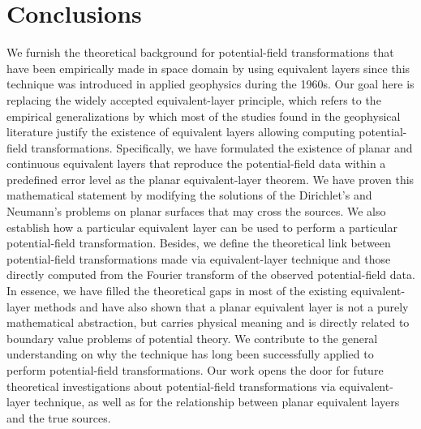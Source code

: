 \section{Conclusions}
\label{sec:conclusions}

We furnish the theoretical background for potential-field transformations
that have been empirically made in space domain by using equivalent layers since 
this technique was introduced in applied geophysics during the 1960s.
Our goal here is replacing the widely accepted equivalent-layer principle, which 
refers to the empirical generalizations
by which most of the studies found in the geophysical literature justify the existence of
equivalent layers allowing computing potential-field transformations.
Specifically, we have formulated the existence of planar and continuous equivalent layers that 
reproduce the potential-field data within a predefined error level
as the planar equivalent-layer theorem.
We have proven this mathematical statement by modifying the solutions of the 
Dirichlet's and Neumann's problems on planar surfaces that may cross the sources.
We also establish how a particular equivalent layer can be used to perform a particular 
potential-field transformation.
Besides, we define the theoretical link between potential-field transformations made via 
equivalent-layer 
technique and those directly computed from the Fourier transform of the observed 
potential-field data. 
In essence, we have filled the theoretical gaps in most of the existing equivalent-layer 
methods and have also shown 
that a planar equivalent layer is not a purely mathematical abstraction,
but carries physical meaning and is directly related to boundary value problems of potential 
theory.
We contribute to the general understanding on why the technique has long been 
successfully applied to perform potential-field transformations. 
Our work opens the door for future theoretical investigations about potential-field 
transformations via 
equivalent-layer technique, as well as for the relationship between planar equivalent layers 
and the true sources.